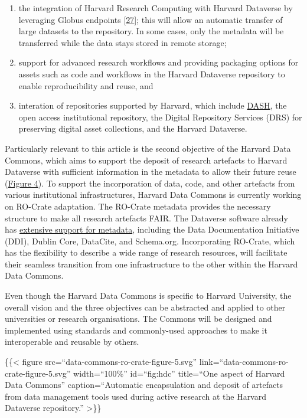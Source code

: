 \begin{enumerate}
\def\labelenumi{\arabic{enumi}.}
\tightlist
\item
  the integration of Harvard Research Computing with Harvard Dataverse
  by leveraging Globus endpoints
  {[}\href{https://doi.org/10.1109/MCC.2014.52}{27}{]}; this will allow
  an automatic transfer of large datasets to the repository. In some
  cases, only the metadata will be transferred while the data stays
  stored in remote storage;
\item
  support for advanced research workflows and providing packaging
  options for assets such as code and workflows in the Harvard Dataverse
  repository to enable reproducibility and reuse, and
\item
  interation of repositories supported by Harvard, which include
  \href{https://dash.harvard.edu/}{DASH}, the open access institutional
  repository, the Digital Repository Services (DRS) for preserving
  digital asset collections, and the Harvard Dataverse.
\end{enumerate}

Particularly relevant to this article is the second objective of the
Harvard Data Commons, which aims to support the deposit of research
artefacts to Harvard Dataverse with sufficient information in the
metadata to allow their future reuse (\protect\hyperlink{fig:hdc}{Figure
4}). To support the incorporation of data, code, and other artefacts
from various institutional infrastructures, Harvard Data Commons is
currently working on RO-Crate adaptation. The RO-Crate metadata provides
the necessary structure to make all research artefacts FAIR. The
Dataverse software already has
\href{https://guides.dataverse.org/en/latest/user/appendix.html}{extensive
support for metadata}, including the Data Documentation Initiative
(DDI), Dublin Core, DataCite, and Schema.org. Incorporating RO-Crate,
which has the flexibility to describe a wide range of research
resources, will facilitate their seamless transition from one
infrastructure to the other within the Harvard Data Commons.

Even though the Harvard Data Commons is specific to Harvard University,
the overall vision and the three objectives can be abstracted and
applied to other universities or research organisations. The Commons
will be designed and implemented using standards and commonly-used
approaches to make it interoperable and reusable by others.

\{\{\textless{} figure src=``data-commons-ro-crate-figure-5.svg''
link=``data-commons-ro-crate-figure-5.svg'' width=``100\%''
id=``fig:hdc'' title=``One aspect of Harvard Data Commons''
caption=``Automatic encapsulation and deposit of artefacts from data
management tools used during active research at the Harvard Dataverse
repository.'' \textgreater\}\}


